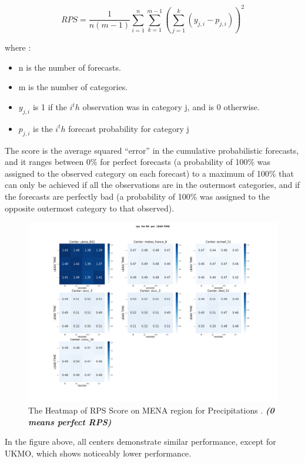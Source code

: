 $$RPS=\frac{1}{n(m-1)}\sum\limits_{i=1}^{n} \sum\limits_{k=1}^{m-1} \left(\sum\limits_{j=1}^{k}(y_{j,i} - p_{j,i})\right)^2  $$

where : 

\begin{itemize}
	\item n is the number of forecasts.
	\item m is the number of categories.
	\item $y_{j,i}$ is 1 if the $i^th$ observation was in category j, and is 0 otherwise.
	\item $p_{j,i}$ is the $i^th$ forecast probability for category j
\end{itemize}

The score is the average squared “error” in the cumulative
probabilistic forecasts, and it ranges between 0\% for perfect forecasts (a probability of 100\%
was assigned to the observed category on each forecast) to a maximum of 100\% that can only
be achieved if all the observations are in the outermost categories, and if the forecasts are
perfectly bad (a probability of 100\% was assigned to the opposite outermost category to that
observed).


\begin{figure}[H]
    \centering
    \includegraphics[scale=0.25]{plots/prob/rps/rps_RR.png}
    \caption{The Heatmap of  RPS Score on MENA region for Precipitations    . \textbf{\textit{(0 means perfect RPS)}}}
\end{figure}

In the figure above, all centers demonstrate similar performance, except for UKMO, which shows noticeably lower performance.




